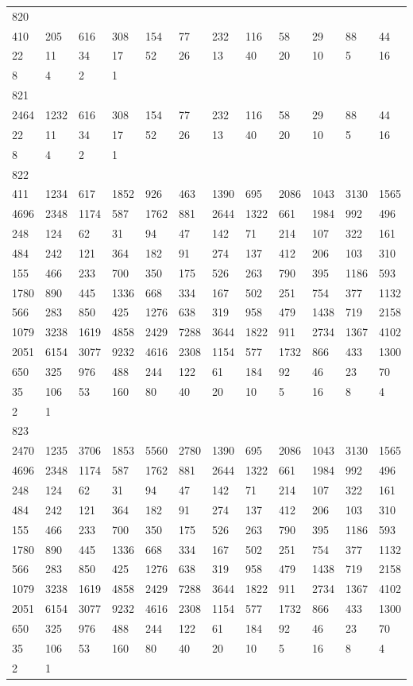\begin{longtable}{llllllllllll}
820&&&&&&&&&&&\\
410& 205& 616& 308& 154& 77& 232& 116& 58& 29& 88& 44\\
22& 11& 34& 17& 52& 26& 13& 40& 20& 10& 5& 16\\
8& 4& 2& 1& \\

821&&&&&&&&&&&\\
2464& 1232& 616& 308& 154& 77& 232& 116& 58& 29& 88& 44\\
22& 11& 34& 17& 52& 26& 13& 40& 20& 10& 5& 16\\
8& 4& 2& 1& \\

822&&&&&&&&&&&\\
411& 1234& 617& 1852& 926& 463& 1390& 695& 2086& 1043& 3130& 1565\\
4696& 2348& 1174& 587& 1762& 881& 2644& 1322& 661& 1984& 992& 496\\
248& 124& 62& 31& 94& 47& 142& 71& 214& 107& 322& 161\\
484& 242& 121& 364& 182& 91& 274& 137& 412& 206& 103& 310\\
155& 466& 233& 700& 350& 175& 526& 263& 790& 395& 1186& 593\\
1780& 890& 445& 1336& 668& 334& 167& 502& 251& 754& 377& 1132\\
566& 283& 850& 425& 1276& 638& 319& 958& 479& 1438& 719& 2158\\
1079& 3238& 1619& 4858& 2429& 7288& 3644& 1822& 911& 2734& 1367& 4102\\
2051& 6154& 3077& 9232& 4616& 2308& 1154& 577& 1732& 866& 433& 1300\\
650& 325& 976& 488& 244& 122& 61& 184& 92& 46& 23& 70\\
35& 106& 53& 160& 80& 40& 20& 10& 5& 16& 8& 4\\
2& 1& \\

823&&&&&&&&&&&\\
2470& 1235& 3706& 1853& 5560& 2780& 1390& 695& 2086& 1043& 3130& 1565\\
4696& 2348& 1174& 587& 1762& 881& 2644& 1322& 661& 1984& 992& 496\\
248& 124& 62& 31& 94& 47& 142& 71& 214& 107& 322& 161\\
484& 242& 121& 364& 182& 91& 274& 137& 412& 206& 103& 310\\
155& 466& 233& 700& 350& 175& 526& 263& 790& 395& 1186& 593\\
1780& 890& 445& 1336& 668& 334& 167& 502& 251& 754& 377& 1132\\
566& 283& 850& 425& 1276& 638& 319& 958& 479& 1438& 719& 2158\\
1079& 3238& 1619& 4858& 2429& 7288& 3644& 1822& 911& 2734& 1367& 4102\\
2051& 6154& 3077& 9232& 4616& 2308& 1154& 577& 1732& 866& 433& 1300\\
650& 325& 976& 488& 244& 122& 61& 184& 92& 46& 23& 70\\
35& 106& 53& 160& 80& 40& 20& 10& 5& 16& 8& 4\\
2& 1& \\


\end{longtable}
